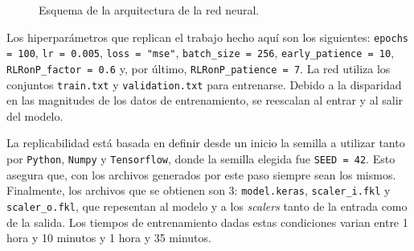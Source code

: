 \documentclass[letterpaper, 12pt]{article}
\begin{document}
\begin{figure}[!ht]
{%
                    }
                    \caption{Esquema de la arquitectura de la red neural.}
                    \label{fig:arquitectura}
                \end{figure}
    
                Los hiperparámetros que replican el trabajo hecho aquí son los siguientes: \texttt{epochs = 100}, \texttt{lr = 0.005}, \texttt{loss = "mse"}, \texttt{batch\_size = 256}, \texttt{early\_patience = 10}, \texttt{RLRonP\_factor = 0.6} y, por último, \texttt{RLRonP\_patience = 7}. La red utiliza los conjuntos \texttt{train.txt} y \texttt{validation.txt} para entrenarse. Debido a la disparidad en las magnitudes de los datos de entrenamiento, se reescalan al entrar y al salir del modelo.
    
                La replicabilidad está basada en definir desde un inicio la semilla a utilizar tanto por \texttt{Python}, \texttt{Numpy} y \texttt{Tensorflow}, donde la semilla elegida fue \texttt{SEED = 42}. Esto asegura que, con los archivos generados por este paso siempre sean los mismos. Finalmente, los archivos que se obtienen son 3: \texttt{model.keras}, \texttt{scaler\_i.fkl} y \texttt{scaler\_o.fkl}, que repesentan al modelo y a los \emph{scalers} tanto de la entrada como de la salida. Los tiempos de entrenamiento dadas estas condiciones varian entre 1 hora y 10 minutos y 1 hora y 35 minutos.
\end{document}

